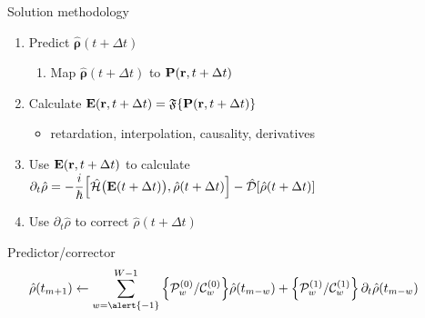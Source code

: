 \documentclass[aspectratio=169, usenames, dvipsnames]{beamer}
\begin{document}
\begin{frame}{Solution methodology}
  \begin{enumerate}
    \item Predict $\hat{\mathbf{\rho}}(t + \Delta t)$
      \begin{enumerate}
        \item Map $\hat{\mathbf{\rho}}(t + \Delta t)$ to $\vb{P}(\vb{r}, t + \Delta t)$
      \end{enumerate}
    \item Calculate $\vb{E}(\vb{r}, t + \Delta t) = \mathfrak{F}\qty{\vb{P}(\vb{r}, t + \Delta t)}$
      \begin{itemize}
        \item retardation, interpolation, causality, derivatives
      \end{itemize}
    \item Use $\displaystyle \vb{E}(\vb{r}, t + \Delta t)$ to calculate $\displaystyle \partial_t \hat{\rho} = -\frac{i}{\hbar} \commutator{\hat{\mathcal{H}}\qty\big(\vb{E}(t + \Delta t))}{\hat{\rho}(t + \Delta t)} - \hat{\mathcal{D}}\qty[\hat{\rho}(t + \Delta t)]$
    \item Use $\partial_t \hat{\rho}$ to correct $\hat{\rho}(t + \Delta t)$
  \end{enumerate}

  \begin{block}{Predictor/corrector}
    \begin{equation*}
    \hat{\rho}(t_{m + 1}) \leftarrow \sum_{w = \alert{-1}}^{W - 1} \qty{\mathcal{P}_{w}^{(0)} / \mathcal{C}_{w}^{(0)}} \hat{\rho}(t_{m-w}) + \qty{\mathcal{P}_{w}^{(1)}/ \mathcal{C}_{w}^{(1)}} \, \partial_t \hat{\rho}(t_{m - w}) \qquad
    \end{equation*}
  \end{block}
\end{frame}
\end{document}

